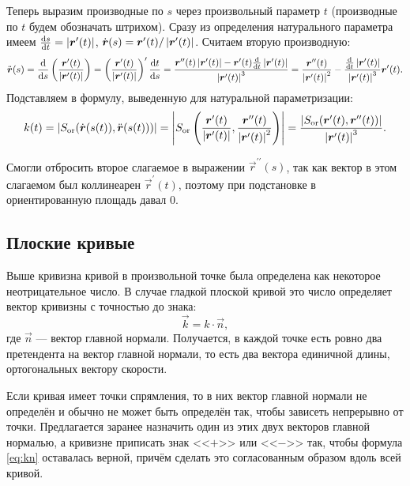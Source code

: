 Теперь выразим производные по $s$ через произвольный параметр $t$ (производные по $t$ будем обозначать штрихом). Сразу из определения натурального параметра имеем $\frac{\d s}{\d t} \hm= \abs{\vec{r}^\prime(t)}$, $\dot{\boldsymbol{r}}(s) = \boldsymbol{r}^\prime(t) / \left\lvert\boldsymbol{r}^\prime(t)\right\rvert$. Считаем вторую производную:
\[
	\ddot{\vec{r}}(s) = \frac{\d}{\d s}\br{\frac{\vec{r}^\prime(t)}{\abs{\vec{r}^\prime(t)}}} = \br{\frac{\vec{r}^\prime(t)}{\abs{\vec{r}^\prime(t)}}}^\prime \frac{\d t}{\d s} = \frac{\vec{r}^{\prime\prime}(t) \abs{\vec{r}^\prime(t)} - \vec{r}^\prime(t)\frac{\d}{\d t}\abs{\vec{r}^\prime(t)}}{\abs{\vec{r}^\prime(t)}^3} = \frac{\vec{r}^{\prime\prime}(t)}{\abs{\vec{r}^\prime(t)}^2} - \frac{\frac{\d}{\d t}\abs{\vec{r}^\prime(t)}}{\abs{\vec{r}^\prime(t)}^3}\vec{r}^\prime(t).
\]
Подставляем в формулу, выведенную для натуральной параметризации:
\begin{equation} \label{eq:CurvatureFormula}
	k(t) = \left\lvert S_{\mathrm{or}}(\dot{\boldsymbol{r}}(s(t)), \ddot{\boldsymbol{r}}(s(t)))\right\rvert = \left\lvert S_{\mathrm{or}}\left(\frac{\boldsymbol{r}^\prime(t)}{\left\lvert\boldsymbol{r}^\prime(t)\right\rvert}, \frac{\boldsymbol{r}^{\prime\prime}(t)}{\left\lvert\boldsymbol{r}^{\prime}(t)\right\rvert^2}\right)\right\rvert = \frac{\left\lvert S_{\mathrm{or}}(\boldsymbol{r}^\prime(t), \boldsymbol{r}^{\prime\prime}(t))\right\rvert}{\left\lvert\boldsymbol{r}^\prime(t)\right\rvert^3}.
\end{equation}

Смогли отбросить второе слагаемое в выражении $\vec{r}^{\prime\prime}(s)$, так как вектор в этом слагаемом был коллинеарен $\vec{r}^\prime(t)$, поэтому при подстановке в ориентированную площадь давал $0$.

\subsection{Плоские кривые}

Выше кривизна кривой в произвольной точке была определена как некоторое неотрицательное число. В случае гладкой плоской кривой это число определяет вектор кривизны с точностью до знака:
\begin{equation} \label{eq:kn}
	\vec{k} = k \cdot \vec{n},
\end{equation}
где $\vec{n}$ --- вектор главной нормали. Получается, в каждой точке есть ровно два претендента на вектор главной нормали, то есть два вектора единичной длины, ортогональных вектору скорости.

Если кривая имеет точки спрямления, то в них вектор главной нормали не определён и обычно не может быть определён так, чтобы зависеть непрерывно от точки. Предлагается заранее назначить один из этих двух векторов главной нормалью, а кривизне приписать знак <<$+$>> или <<$-$>> так, чтобы формула \eqref{eq:kn} оставалась верной, причём сделать это согласованным образом вдоль всей кривой.

